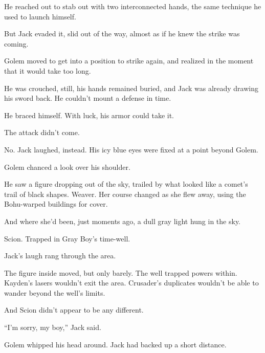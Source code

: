 He reached out to stab out with two interconnected hands, the same technique he used to launch himself.



But Jack evaded it, slid out of the way, almost as if he knew the strike was coming.



Golem moved to get into a position to strike again, and realized in the moment that it would take too long.



He was crouched, still, his hands remained buried, and Jack was already drawing his sword back.  He couldn't mount a defense in time.



He braced himself.  With luck, his armor could take it.



The attack didn't come.



No.  Jack laughed, instead.  His icy blue eyes were fixed at a point beyond Golem.



Golem chanced a look over his shoulder.



He saw a figure dropping out of the sky, trailed by what looked like a comet's trail of black shapes.  Weaver.  Her course changed as she flew away, using the Bohu-warped buildings for cover.



And where she'd been, just moments ago, a dull gray light hung in the sky.



Scion.  Trapped in Gray Boy's time-well.



Jack's laugh rang through the area.



The figure inside moved, but only barely.  The well trapped powers within.  Kayden's lasers wouldn't exit the area.  Crusader's duplicates wouldn't be able to wander beyond the well's limits.



And Scion didn't appear to be any different.



``I'm sorry, my boy,'' Jack said.



Golem whipped his head around.  Jack had backed up a short distance.



